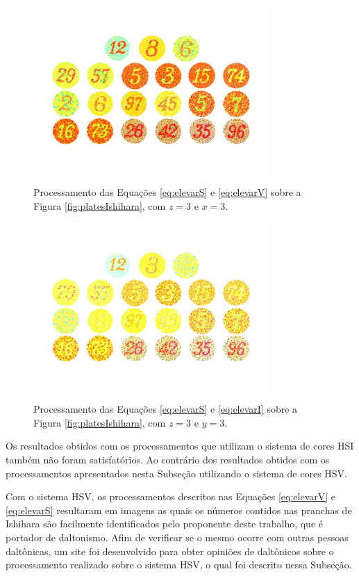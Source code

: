 \documentclass[	12pt, Times, openright, twoside, a4paper, english, brazil]{abntex2}
\begin{document}
\begin{figure}[!htb]
\centering \includegraphics[width=0.80\textwidth]{figuraElevarSeV.jpg}
\caption{Processamento das Equações \ref{eq:elevarS} e \ref{eq:elevarV} sobre a Figura \ref{fig:platesIshihara}, com $z = 3$ e $x = 3$. \label{fig:figuraElevarSeV}}
\end{figure}

\begin{figure}[!htb]
\centering \includegraphics[width=0.80\textwidth]{figuraElevarSeI.jpg}
\caption{Processamento das Equações \ref{eq:elevarS} e \ref{eq:elevarI} sobre a Figura \ref{fig:platesIshihara}, com $z = 3$ e $y = 3$. \label{fig:figuraElevarSeI}}
\end{figure}

Os resultados obtidos com os processamentos que utilizam o sistema de cores HSI também não foram satisfatórios. Ao contrário dos resultados obtidos com os processamentos apresentados nesta Subseção utilizando o sistema de cores HSV.

Com o sistema HSV, os processamentos descritos nas Equações \ref{eq:elevarV} e \ref{eq:elevarS} resultaram em imagens as quais os números contidos nas pranchas de Ishihara são facilmente identificados pelo proponente deste trabalho, que é portador de daltonismo. Afim de verificar se o mesmo ocorre com outras pessoas daltônicas, um site foi desenvolvido para obter opiniões de daltônicos sobre o processamento realizado sobre o sistema HSV, o qual foi descrito nessa Subseção.
\end{document}
